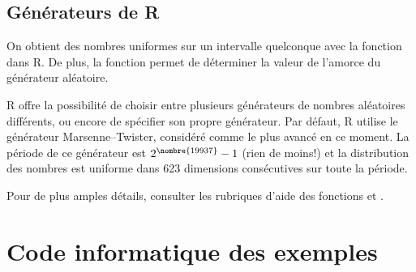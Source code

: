 \subsection{Générateurs de R}

On obtient des nombres uniformes sur un intervalle quelconque avec la
fonction  dans R. De plus, la fonction
 permet de déterminer la valeur de l'amorce du
générateur aléatoire.

R offre la possibilité de choisir entre plusieurs générateurs de
nombres aléatoires différents, ou encore de spécifier son propre
générateur. Par défaut, R utilise le générateur Marsenne--Twister,
considéré comme le plus avancé en ce moment. La période de ce
générateur est $2^{\nombre{19937}} - 1$ (rien de moins!) et la
distribution des nombres est uniforme dans 623 dimensions consécutives
sur toute la période.

Pour de plus amples détails, consulter les rubriques d'aide des
fonctions  et .


\section{Code informatique des exemples}
\label{sec:generation:code}





